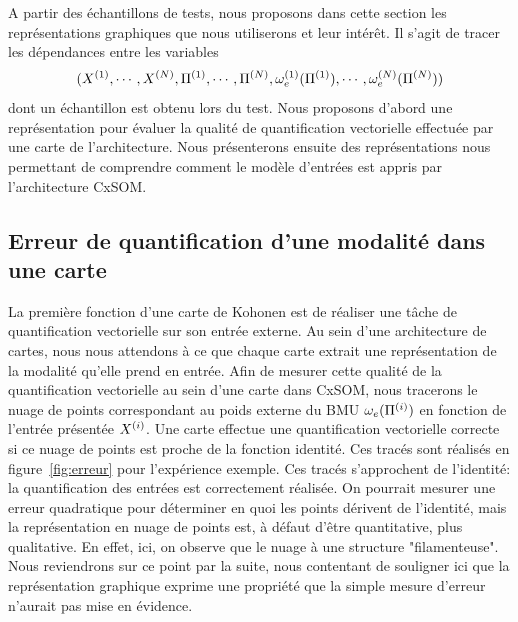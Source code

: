 A partir des échantillons de tests, nous proposons dans cette section les représentations graphiques que nous utiliserons et leur intérêt.
Il s'agit de tracer les dépendances entre les variables $$(X^{({1})}, \cdots, X^{({N})}, \Pi^{({1})}, \cdots, \Pi^{({N})}, \omega_e^{({1})}(\Pi^{({1})}), \cdots, \omega_e^{({N})}(\Pi^{({N})}))$$ dont un échantillon est obtenu lors du test.
Nous proposons d'abord une représentation pour évaluer la qualité de quantification vectorielle effectuée par une carte de l'architecture. Nous présenterons ensuite des représentations nous permettant de comprendre comment le modèle d'entrées est appris par l'architecture CxSOM.
\subsection{Erreur de quantification d'une modalité dans une carte}

La première fonction d'une carte de Kohonen est de réaliser une tâche de quantification vectorielle sur son entrée externe. Au sein d'une architecture de cartes, nous nous attendons à ce que chaque carte extrait une représentation de la modalité qu'elle prend en entrée.
Afin de mesurer cette qualité de la quantification vectorielle au sein d'une carte dans CxSOM, nous tracerons le nuage de points correspondant au poids externe du BMU $\omega_e(\Pi^{({i})})$ en fonction de l'entrée présentée $X^{({i})}$. Une carte effectue une quantification vectorielle correcte si ce nuage de points est proche de la fonction identité.
Ces tracés sont réalisés en figure~\ref{fig:erreur} pour l'expérience exemple. Ces tracés s'approchent de l'identité: la quantification des entrées est correctement réalisée.
On pourrait mesurer une erreur quadratique pour déterminer en quoi les points dérivent de l'identité, mais la représentation en nuage de points est, à défaut d'être quantitative, plus qualitative. En effet, ici, on observe que le nuage à une structure "filamenteuse". Nous reviendrons sur ce point par la suite, nous contentant de souligner ici que la représentation graphique exprime une propriété que la simple mesure d'erreur n'aurait pas mise en évidence. 

